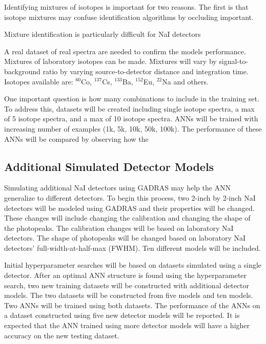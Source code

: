 \documentclass[tocnosub,noragright,centerchapter,12pt,fullpage]{uiucecethesis09}
\begin{document}
Identifying mixtures of isotopes is important for two reasons. The first is that isotope mixtures may confuse identification algorithms by occluding important.

Mixture identification is particularly difficult for NaI detectors 

A real dataset of real spectra are needed to confirm the models performance. Mixtures of laboratory isotopes can be made. Mixtures will vary by signal-to-background ratio by varying source-to-detector distance and integration time. Isotopes available are: $^{60}$Co, $^{137}$Cs, $^{133}$Ba, $^{152}$Eu, $^{22}$Na and others. %



One important question is how many combinations to include in the training set. To address this, datasets will be created including single isotope spectra, a max of 5 isotope spectra, and a max of 10 isotope spectra. ANNs will be trained with increasing number of examples (1k, 5k, 10k, 50k, 100k). The performance of these ANNs will be compared by observing how the 

\fi

\subsection{Additional Simulated Detector Models}

Simulating additional NaI detectors using GADRAS may help the ANN generalize to different detectors. To begin this process, two 2-inch by 2-inch NaI detectors will be modeled using GADRAS and their properties will be changed. These changes will include changing the calibration and changing the shape of the photopeaks. The calibration changes will be based on laboratory NaI detectors. The shape of photopeaks will be changed based on laboratory NaI detectors' full-width-at-half-max (FWHM). Ten different models will be included. 

Initial hyperparameter searches will be based on datasets simulated using a single detector. After an optimal ANN structure is found using the hyperparameter search, two new training datasets will be constructed with additional detector models. The two datasets will be constructed from five models and ten models. Two ANNs will be trained using both datasets. The performance of the ANNs on a dataset constructed using five new detector models will be reported. It is expected that the ANN trained using more detector models will have a higher accuracy on the new testing dataset. 
\end{document}

